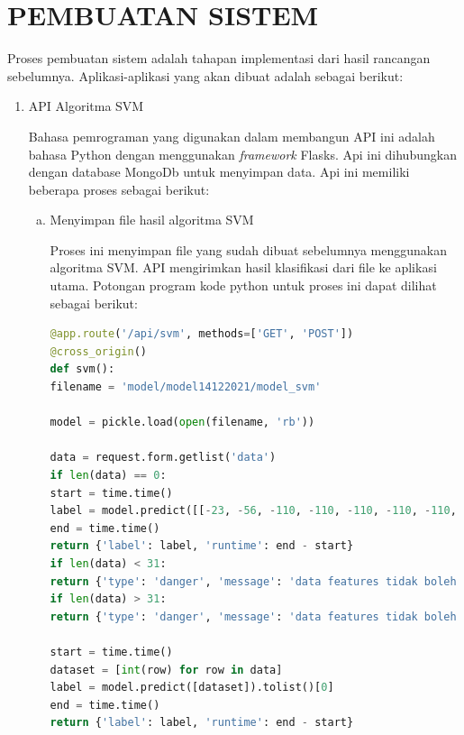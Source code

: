 \section{PEMBUATAN SISTEM}
\par Proses pembuatan sistem adalah tahapan implementasi dari hasil rancangan sebelumnya. Aplikasi-aplikasi yang akan dibuat adalah sebagai berikut:
\begin{enumerate}[1.]
	\item API Algoritma SVM
	      \par Bahasa pemrograman yang digunakan dalam membangun API ini adalah bahasa Python dengan menggunakan \textit{framework} Flasks.  Api ini dihubungkan dengan database MongoDb untuk menyimpan data. Api ini memiliki beberapa proses sebagai berikut:
	      \begin{enumerate}[a.]
		      \item Menyimpan file hasil algoritma SVM
		            \par Proses ini menyimpan file yang sudah dibuat sebelumnya menggunakan algoritma SVM. API mengirimkan hasil klasifikasi dari file ke aplikasi utama. Potongan program kode python untuk proses ini dapat dilihat sebagai berikut:
		            \begin{lstlisting}[language=Python]
@app.route('/api/svm', methods=['GET', 'POST'])
@cross_origin()
def svm():
filename = 'model/model14122021/model_svm'
						
model = pickle.load(open(filename, 'rb'))
						
data = request.form.getlist('data')
if len(data) == 0:
start = time.time()
label = model.predict([[-23, -56, -110, -110, -110, -110, -110, -110, -110, -110, -110, -96,	-100,	-97,	-90,	-90,	-93,	-89,	-95,	-95, -85,	-78,	-95,	-95,	-88, -95,	-110,	-110,	-110,	-110,	-110]]).tolist()[0]
end = time.time()
return {'label': label, 'runtime': end - start}
if len(data) < 31:
return {'type': 'danger', 'message': 'data features tidak boleh dibawah 20'}
if len(data) > 31:
return {'type': 'danger', 'message': 'data features tidak boleh diatas 20'}	

start = time.time()
dataset = [int(row) for row in data]
label = model.predict([dataset]).tolist()[0]
end = time.time()
return {'label': label, 'runtime': end - start}				
								\end{lstlisting}


\end{enumerate}
\end{enumerate}
